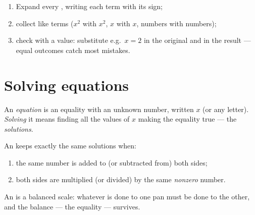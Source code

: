 \begin{method}\label{met:g8:equations:reduce}
\begin{enumerate}
  \item Expand every , writing each term with its sign;
  \item collect like terms ($x^2$ with $x^2$, $x$ with $x$, numbers
        with numbers);
  \item check with a value: substitute e.g.\ $x = 2$ in the original
        and in the result --- equal outcomes catch most mistakes.
\end{enumerate}
\end{method}

\section{Solving equations}

\begin{definition}[Equation]\label{def:g8:equations:def}
An \emph{equation} is an equality with an unknown
number, written $x$ (or any letter). \emph{Solving} it means finding
all the values of $x$ making the equality true --- the
\emph{solutions}.
\end{definition}

\begin{theorem}\label{thm:g8:equations:balance}
An  keeps exactly the same solutions when:
\begin{enumerate}
  \item the same number is added to (or subtracted from) both sides;
  \item both sides are multiplied (or divided) by the same
        \emph{nonzero} number.
\end{enumerate}
\end{theorem}
\admitted

\begin{omfigure}

{\small An  is a balanced scale: whatever is done to one pan
must be done to the other, and the balance --- the equality ---
survives.}
\end{omfigure}

